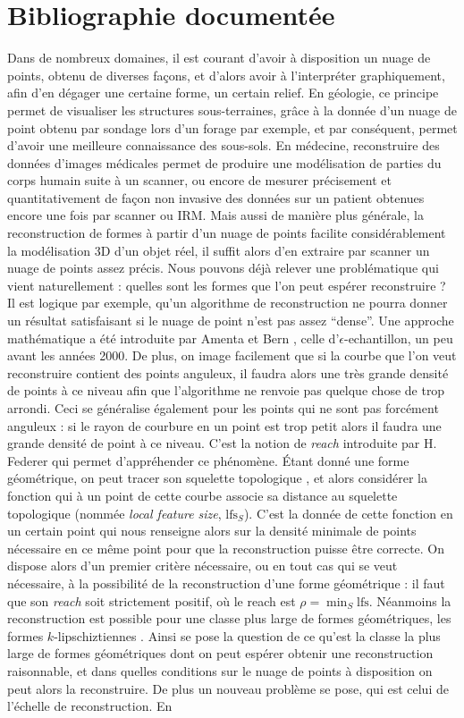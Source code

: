 \documentclass{article}
\begin{document}
\section*{Bibliographie documentée}
Dans de nombreux domaines, il est courant d'avoir à disposition un nuage de points, obtenu de diverses façons, et d'alors avoir à l'interpréter graphiquement, afin d'en dégager une certaine forme, un certain relief. En géologie, ce principe permet de visualiser les structures sous-terraines, grâce à la donnée d'un nuage de point obtenu par sondage lors d'un forage par exemple, et par conséquent, permet d'avoir une meilleure connaissance des sous-sols. En médecine, reconstruire des données d'images médicales permet de produire une modélisation de parties du corps humain suite à un scanner, ou encore de mesurer précisement et quantitativement de façon non invasive des données sur un patient obtenues encore une fois par scanner ou IRM. Mais aussi de manière plus générale, la reconstruction de formes à partir d'un nuage de points facilite considérablement la modélisation 3D d'un objet réel, il suffit alors d'en extraire par scanner un nuage de points assez précis. Nous pouvons déjà relever une problématique qui vient naturellement : quelles sont les formes que l'on peut espérer reconstruire ? Il est logique par exemple, qu'un algorithme de reconstruction ne pourra donner un résultat satisfaisant si le nuage de point n'est pas assez ``dense''. Une approche mathématique a été introduite par Amenta et Bern \cite{echa}, celle d'$\epsilon$-echantillon, un peu avant les années 2000. De plus, on image facilement que si la courbe que l'on veut reconstruire contient des points anguleux, il faudra alors une très grande densité de points à ce niveau afin que l'algorithme ne renvoie pas quelque chose de trop arrondi. Ceci se généralise également pour les points qui ne sont pas forcément anguleux : si le rayon de courbure en un point est trop petit alors il faudra une grande densité de point à ce niveau. C'est la notion de \textit{reach} introduite par H. Federer \cite{fede} qui permet d'appréhender ce phénomène. Étant donné une forme géométrique, on peut tracer son squelette topologique \cite{sque}, et alors considérer la fonction qui à un point de cette courbe associe sa distance au squelette topologique (nommée \textit{local feature size}, $\mathrm{lfs}_S$). C'est la donnée de cette fonction en un certain point qui nous renseigne alors sur la densité minimale de points nécessaire en ce même point pour que la reconstruction puisse être correcte. On dispose alors d'un premier critère nécessaire, ou en tout cas qui se veut nécessaire, à la possibilité de la reconstruction d'une forme géométrique : il faut que son \textit{reach} soit strictement positif, où le reach est $\rho=\min_S\mathrm{lfs}$. Néanmoins la reconstruction est possible pour une classe plus large de formes géométriques, les formes $k$-lipschiztiennes \cite{lips}. Ainsi se pose la question de ce qu'est la classe la plus large de formes géométriques dont on peut espérer obtenir une reconstruction raisonnable, et dans quelles conditions sur le nuage de points à disposition on peut alors la reconstruire. De plus un nouveau problème se pose, qui est celui de l'échelle de reconstruction. En 
\end{document}
